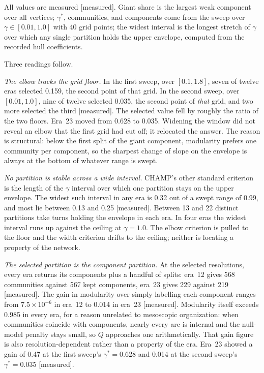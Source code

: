 \documentclass[11pt]{article}
\newcommand{\meas}{{\footnotesize\textsf{[measured]}}}
\begin{document}
\noindent All values are measured \meas{}. Giant share is the largest weak component over all
vertices; $\gamma^{*}$, communities, and components come from the sweep over
$\gamma \in [0.01, 1.0]$ with 40 grid points; the widest interval is the longest stretch of
$\gamma$ over which any single partition holds the upper envelope, computed from the recorded
hull coefficients.

Three readings follow.

\emph{The elbow tracks the grid floor.} In the first sweep, over $[0.1, 1.8]$, seven of twelve
eras selected 0.159, the second point of that grid. In the second sweep, over $[0.01, 1.0]$,
nine of twelve selected 0.035, the second point of \emph{that} grid, and two more selected the
third \meas{}. The selected value fell by roughly the ratio of the two floors. Era~23 moved
from 0.628 to 0.035. Widening the window did not reveal an elbow that the first grid had cut
off; it relocated the answer. The reason is structural: below the first split of the giant
component, modularity prefers one community per component, so the sharpest change of slope on
the envelope is always at the bottom of whatever range is swept.

\emph{No partition is stable across a wide interval.} CHAMP's other standard criterion is the
length of the $\gamma$ interval over which one partition stays on the upper envelope. The
widest such interval in any era is 0.32 out of a swept range of 0.99, and most lie between
0.13 and 0.25 \meas{}. Between 13 and 22 distinct partitions take turns holding the envelope
in each era. In four eras the widest interval runs up against the ceiling at $\gamma = 1.0$.
The elbow criterion is pulled to the floor and the width criterion drifts to the ceiling;
neither is locating a property of the network.

\emph{The selected partition is the component partition.} At the selected resolutions, every
era returns its components plus a handful of splits: era~12 gives 568 communities against 567
kept components, era~23 gives 229 against 219 \meas{}. The gain in modularity over simply
labelling each component ranges from $7.5 \times 10^{-6}$ in era~12 to 0.014 in era~23
\meas{}. Modularity itself exceeds 0.985 in every era, for a reason unrelated to mesoscopic
organization: when communities coincide with components, nearly every arc is internal and the
null-model penalty stays small, so $Q$ approaches one arithmetically. That gain figure is also
resolution-dependent rather than a property of the era. Era~23 showed a gain of 0.47 at the
first sweep's $\gamma^{*} = 0.628$ and 0.014 at the second sweep's $\gamma^{*} = 0.035$
\meas{}.
\end{document}
